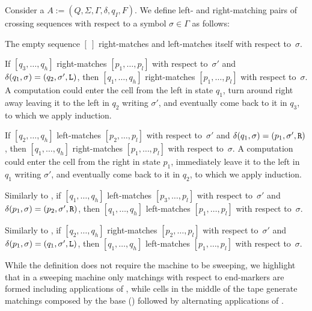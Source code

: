 \begin{defn}
	Consider a \kDLA $A:=(Q,\Sigma,\Gamma,\delta,q_I,F)$.
	We define left- and right-matching pairs of crossing sequences with respect to a symbol $\sigma\in\Gamma$ as follows:
	\begin{rules}
		\item \label{itm:crossmatchswepDLA-1} The empty sequence $[~]$ right-matches and left-matches itself with respect to~$\sigma$.
		\item \label{itm:crossmatchswepDLA-2} If $[q_3,\dots,q_h]$ right-matches $[p_1,\dots,p_l]$ with respect to~$\sigma'$ and $\delta(q_1,\sigma)=(q_2,\sigma',\mathtt L)$, then $[q_1,\dots,q_h]$ right-matches $[p_1,\dots,p_l]$ with respect to~$\sigma$.
		A computation could enter the cell from the left in state $q_1$, turn around right away leaving it to the left in $q_2$ writing $\sigma'$, and eventually come back to it in $q_3$, to which we apply induction.
		\item \label{itm:crossmatchswepDLA-3} If $[q_2,\dots,q_h]$ left-matches $[p_2,\dots,p_l]$ with respect to~$\sigma'$ and $\delta(q_1,\sigma)=(p_1,\sigma',\mathtt R)$, then $[q_1,\dots,q_h]$ right-matches $[p_1,\dots,p_l]$ with respect to~$\sigma$.
		A computation could enter the cell from the right in state $p_1$, immediately leave it to the left in $q_1$ writing $\sigma'$, and eventually come back to it in $q_2$, to which we apply induction.
		\item \label{itm:crossmatchswepDLA-4} Similarly to , if $[q_1,\dots,q_h]$ left-matches $[p_3,\dots,p_l]$ with respect to~$\sigma'$ and $\delta(p_1,\sigma)=(p_2,\sigma',\mathtt R)$, then $[q_1,\dots,q_h]$ left-matches $[p_1,\dots,p_l]$ with respect to~$\sigma$.
		\item \label{itm:crossmatchswepDLA-5} Similarly to , if $[q_2,\dots,q_h]$ right-matches $[p_2,\dots,p_l]$ with respect to~$\sigma'$ and $\delta(p_1,\sigma)=(q_1,\sigma',\mathtt L)$, then $[q_1,\dots,q_h]$ left-matches $[p_1,\dots,p_l]$ with respect to~$\sigma$.
	\end{rules}
\end{defn}

While the definition does not require the machine to be sweeping, we highlight that in a sweeping machine only matchings with respect to end-markers are formed including applications of , while cells in the middle of the tape generate matchings composed by the base () followed by alternating applications of .

